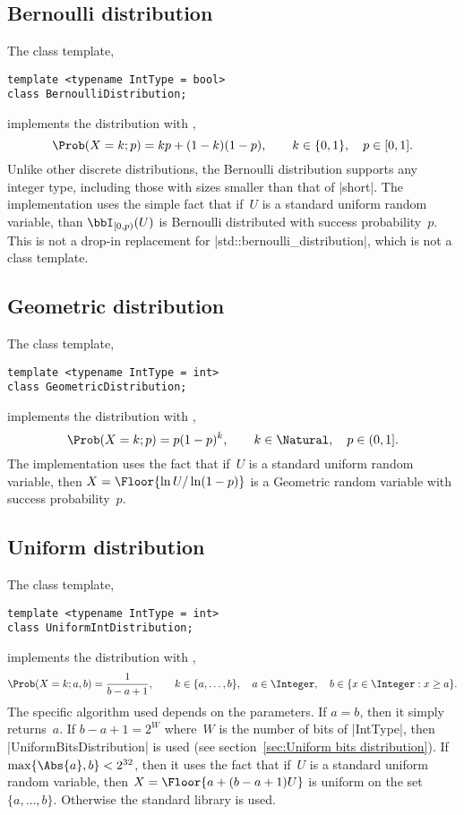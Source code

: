 \subsection{Bernoulli distribution}
\label{sub:Bernoulli distribution}

The class template,
\begin{verbatim}
template <typename IntType = bool>
class BernoulliDistribution;
\end{verbatim}
implements the distribution with \pdf,
\begin{equation*}
  \Prob(X = k;p) = kp + (1 - k)(1 - p),\qquad
  k \in \{0, 1\},\quad p \in [0, 1].
\end{equation*}
Unlike other discrete distributions, the Bernoulli distribution supports any
integer type, including those with sizes smaller than that of |short|. The
implementation uses the simple fact that if~$U$ is a standard uniform random
variable, than $\bbI_{[0,p)}(U)$ is Bernoulli distributed with success
probability~$p$. This is not a drop-in replacement for
|std::bernoulli_distribution|, which is not a class template.

\subsection{Geometric distribution}
\label{sub:Geometric distribution}

The class template,
\begin{verbatim}
template <typename IntType = int>
class GeometricDistribution;
\end{verbatim}
implements the distribution with \pdf,
\begin{equation*}
  \Prob(X = k;p) = p(1-p)^k,\qquad
  k \in \Natural,\quad p \in (0, 1].
\end{equation*}
The implementation uses the fact that if~$U$ is a standard uniform random
variable, then $X = \Floor{\ln U / \ln(1-p)}$ is a Geometric random variable
with success probability~$p$.

\subsection{Uniform distribution}
\label{sub:Uniform distribution}

The class template,
\begin{verbatim}
template <typename IntType = int>
class UniformIntDistribution;
\end{verbatim}
implements the distribution with \pdf,
\begin{equation*}
  \Prob(X = k;a,b) = \frac{1}{b - a + 1},\qquad
  k \in \{a,\dots,b\},\quad
  a \in \Integer,\quad b \in \{x \in \Integer: x \ge a\}.
\end{equation*}
The specific algorithm used depends on the parameters. If $a = b$, then it
simply returns~$a$. If $b - a + 1 = 2^W$ where~$W$ is the number of bits of
|IntType|, then |UniformBitsDistribution| is used (see section~\ref{sec:Uniform
bits distribution}). If $\max\{\Abs{a}, b\} < 2^{32}$, then it uses the fact
that if~$U$ is a standard uniform random variable, then $X = \Floor{a + (b - a
+ 1) U}$ is uniform on the set $\{a,\dots,b\}$. Otherwise the standard library
is used.

